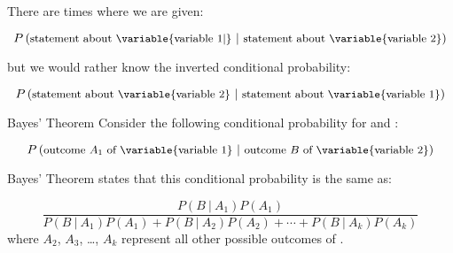 \documentclass{beamer}
\newcommand{\prob}[1]{P\left({#1}\right)}
\newcommand{\condprob}[2]{\prob{{#1}~|~{#2}}}
\begin{document}
\newcommand{\bayesterm}[2]{\condprob{#1}{#2}\prob{#2}}
\begin{frame}
\begin{note}
There are times where we are given:

\vspace{-4mm}
\begin{equation*}
\condprob{\text{\small statement about \variable{variable 1|}}}{\text{\small statement about \variable{variable 2}}}
\end{equation*}

\vspace{-1mm}
but we would rather know the inverted conditional probability:

\vspace{-4mm}
\begin{equation*}
\condprob{\text{\small statement about \variable{variable 2}}}{\text{\small statement about \variable{variable 1}}}
\end{equation*}
\end{note}\pause

\begin{block}{Bayes' Theorem}
Consider the following conditional probability for  and :

\vspace{-4mm}
\begin{equation*}
\condprob{\text{\small outcome $A_1$ of \variable{variable 1}}}{\text{\small outcome $B$ of \variable{variable 2}}}
\end{equation*}

\vspace{-1mm}
Bayes' Theorem states that this conditional probability is the same as:

\vspace{-2mm}
\begin{equation*}
\dfrac{\bayesterm{B}{A_1}}{\bayesterm{B}{A_1}+\bayesterm{B}{A_2}+\cdots+\bayesterm{B}{A_k}}
\end{equation*}
\small
where $A_2$, $A_3$, \ldots, $A_k$ represent all other possible outcomes of .
\end{block}
\end{frame}
\end{document}
